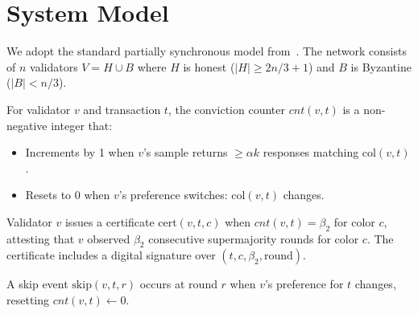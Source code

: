 \section{System Model}

\label{sec:model}

We adopt the standard partially synchronous model from~\cite{dwork1988consensus}.
The network consists of $n$ validators $V = H \cup B$ where $H$ is honest ($|H| \geq 2n/3 + 1$)
and $B$ is Byzantine ($|B| < n/3$).

\begin{definition}
For validator $v$ and transaction $t$, the conviction counter $cnt(v, t)$ is a
non-negative integer that:
\begin{itemize}[nosep]
\item Increments by 1 when $v$'s sample returns $\geq \alpha k$ responses matching
$\text{col}(v, t)$.
\item Resets to 0 when $v$'s preference switches: $\text{col}(v, t)$ changes.
\end{itemize}
\end{definition}

\begin{definition}[Certificate]
Validator $v$ issues a certificate $\text{cert}(v, t, c)$ when $cnt(v, t) = \beta_2$
for color $c$, attesting that $v$ observed $\beta_2$ consecutive supermajority rounds
for color $c$. The certificate includes a digital signature over
$(t, c, \beta_2, \text{round})$.
\end{definition}

\begin{definition}[Skip]
A skip event $\text{skip}(v, t, r)$ occurs at round $r$ when $v$'s preference for $t$
changes, resetting $cnt(v, t) \gets 0$.
\end{definition}

